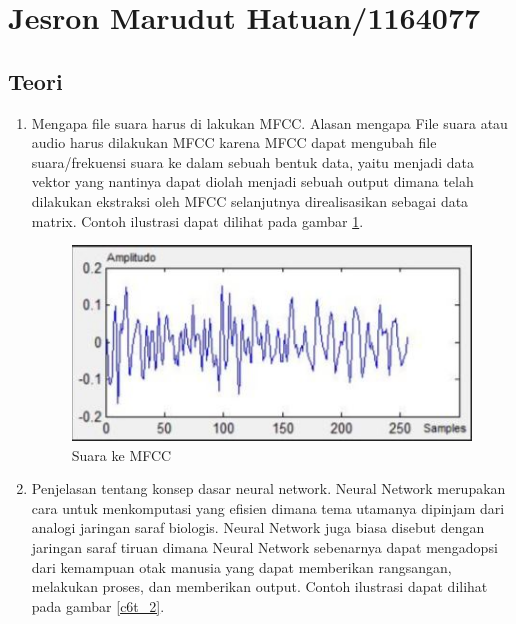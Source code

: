 
\section{Jesron Marudut Hatuan/1164077}
\subsection{Teori}
\begin{enumerate}
\item Mengapa file suara harus di lakukan MFCC.
\subitem Alasan mengapa File suara atau audio harus dilakukan MFCC  karena MFCC dapat mengubah file suara/frekuensi suara ke dalam sebuah bentuk data, yaitu menjadi data vektor yang nantinya dapat diolah menjadi sebuah output dimana telah dilakukan ekstraksi oleh MFCC selanjutnya direalisasikan sebagai data matrix. Contoh ilustrasi dapat dilihat pada gambar \ref{c6t_1}.
\begin{figure}[!htbp]
\centerline{\includegraphics[width=1\textwidth]{figures/c6t/1.JPG}}
\caption{Suara ke MFCC}
\label{c6t_1}
\end{figure} 
\item Penjelasan tentang konsep dasar neural network.
\subitem Neural Network merupakan cara untuk menkomputasi yang efisien dimana tema utamanya dipinjam dari analogi jaringan saraf biologis. Neural Network juga biasa disebut dengan jaringan saraf tiruan dimana Neural Network sebenarnya dapat mengadopsi dari kemampuan otak manusia yang dapat memberikan rangsangan, melakukan proses, dan memberikan output. Contoh ilustrasi dapat dilihat pada gambar \ref{c6t_2}.
\begin{figure}[!htbp]

\end{figure}
\end{enumerate}

